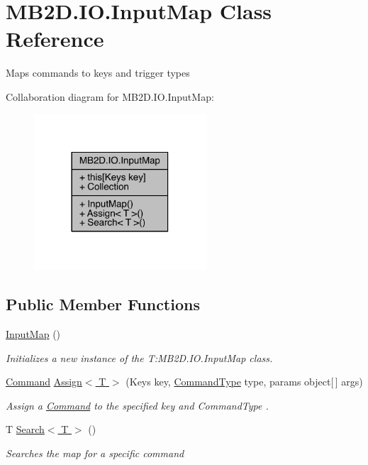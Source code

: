 \hypertarget{class_m_b2_d_1_1_i_o_1_1_input_map}{}\section{M\+B2\+D.\+I\+O.\+Input\+Map Class Reference}
\label{class_m_b2_d_1_1_i_o_1_1_input_map}


Maps commands to keys and trigger types  




Collaboration diagram for M\+B2\+D.\+I\+O.\+Input\+Map\+:\nopagebreak
\begin{figure}[H]
\begin{center}
\leavevmode
\includegraphics[width=182pt]{class_m_b2_d_1_1_i_o_1_1_input_map__coll__graph}
\end{center}
\end{figure}
\subsection*{Public Member Functions}
\begin{DoxyCompactItemize}
\item 
\hyperlink{class_m_b2_d_1_1_i_o_1_1_input_map_a37cd0d946d9a15c9a5ce96d5ca2ca8f1}{Input\+Map} ()
\begin{DoxyCompactList}\small\item\em Initializes a new instance of the T\+:\+M\+B2\+D.\+I\+O.\+Input\+Map class. \end{DoxyCompactList}\item 
\hyperlink{class_m_b2_d_1_1_i_o_1_1_command}{Command} \hyperlink{class_m_b2_d_1_1_i_o_1_1_input_map_a07131c13b291c957512c08aa0d814890}{Assign$<$ T $>$} (Keys key, \hyperlink{namespace_m_b2_d_1_1_i_o_ab5f95f3fe9e652778b62bdf943168a68}{Command\+Type} type, params object\mbox{[}$\,$\mbox{]} args)
\begin{DoxyCompactList}\small\item\em Assign a \hyperlink{class_m_b2_d_1_1_i_o_1_1_command}{Command} to the specified key and Command\+Type . \end{DoxyCompactList}\item 
T \hyperlink{class_m_b2_d_1_1_i_o_1_1_input_map_ae5537db7c751ba05196cc71d5f98bf87}{Search$<$ T $>$} ()
\begin{DoxyCompactList}\small\item\em Searches the map for a specific command \end{DoxyCompactList}\end{DoxyCompactItemize}
